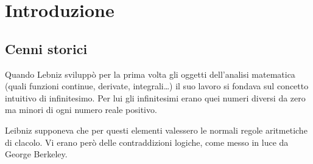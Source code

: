 \chapter*{Introduzione}






\section*{Cenni storici}

Quando Lebniz sviluppò per la prima volta gli oggetti dell'analisi matematica (quali funzioni continue, derivate, integrali\dots) il suo lavoro si fondava sul concetto intuitivo di infinitesimo. Per lui gli infinitesimi erano quei numeri diversi da zero ma minori di ogni numero reale positivo.

Leibniz supponeva che per questi elementi valessero le normali regole aritmetiche di clacolo. Vi erano però delle contraddizioni logiche, come messo in luce da George Berkeley. 

